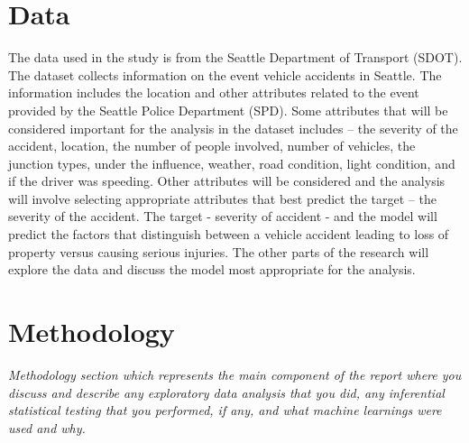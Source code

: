 \documentclass[a4paper,12pt]{article}
\begin{document}
\section{Data}
The data used in the study is from the Seattle Department of Transport (SDOT). The dataset collects information on the event vehicle accidents in Seattle. The information includes the location and other attributes related to the event provided by the Seattle Police Department (SPD). Some attributes that will be considered important for the analysis in the dataset includes – the severity of the accident, location, the number of people involved, number of vehicles, the junction types, under the influence, weather, road condition, light condition, and if the driver was speeding. Other attributes will be considered and the analysis will involve selecting appropriate attributes that best predict the target – the severity of the accident. The target - severity of accident -  and the model will predict the factors that distinguish between a vehicle accident leading to loss of property versus causing serious injuries. The other parts of the research will explore the data and discuss the model most appropriate for the analysis.

\newpage
\section{Methodology}
\textit{Methodology section which represents the main component of the report where you discuss and describe any exploratory data analysis that you did, any inferential statistical testing that you performed, if any, and what machine learnings were used and why.}
\end{document}
